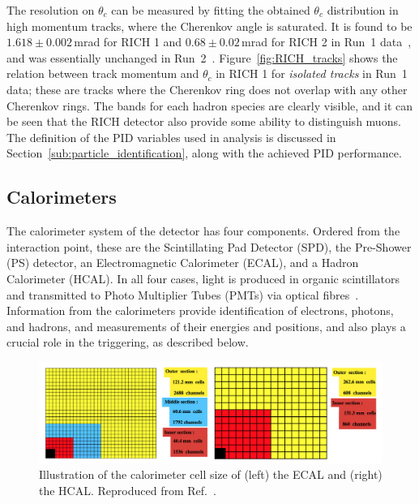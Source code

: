 The resolution on $\theta_c$ can be measured by fitting the obtained $\theta_c$ distribution in high momentum tracks, where the Cherenkov angle is saturated. It is found to be $1.618 \pm 0.002$\,mrad for RICH 1 and $0.68 \pm 0.02$\,mrad for RICH 2 in Run~1 data~\cite{RICH-Performance}, and was essentially unchanged in Run~2~\cite{RICH-Performance-2}. Figure~\ref{fig:RICH_tracks} shows the relation between track momentum and $\theta_c$ in RICH 1 for \emph{isolated tracks} in Run~1 data; these are tracks where the Cherenkov ring does not overlap with any other Cherenkov rings. The bands for each hadron species are clearly visible, and it can be seen that the RICH detector also provide some ability to distinguish muons. The definition of the PID variables used in analysis is discussed in Section~\ref{sub:particle_identification}, along with the achieved PID performance.

\subsection{Calorimeters} %
\label{sub:calorimeters}

The calorimeter system of the \lhcb detector has four components. Ordered from the interaction point, these are the Scintillating Pad Detector (SPD), the Pre-Shower (PS) detector, an Electromagnetic Calorimeter (ECAL), and a Hadron Calorimeter (HCAL). In all four cases, light is produced in organic scintillators and transmitted to Photo Multiplier Tubes (PMTs) via optical fibres~\cite{LHCb-detector}. Information from the calorimeters provide identification of electrons, photons, and hadrons, and measurements of their energies and positions, and also plays a crucial role in the triggering, as described below. 

\begin{figure}[tb]
    \centering
    \includegraphics[width=0.9\columnwidth]{figures/detector/cell_modules.png}
    \caption{Illustration of the calorimeter cell size of (left) the ECAL and (right) the HCAL. Reproduced from Ref.~\cite{CAL-TDR}.}
    \label{fig:cal_cells}
\end{figure}


